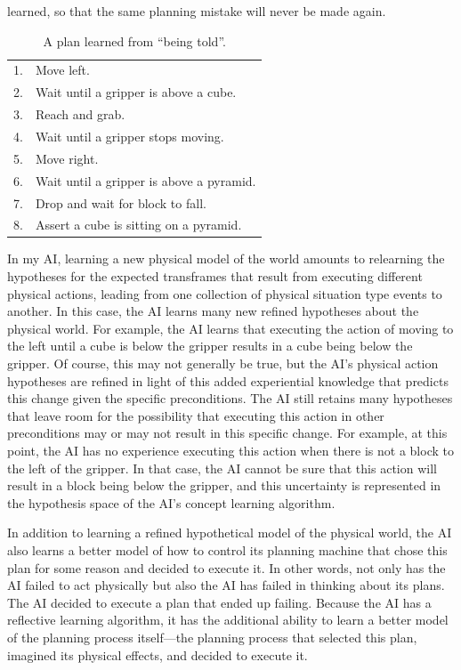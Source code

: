 learned, so that the same planning mistake will never be made again.
\begin{table}
\centering
\begin{tabular}{|rl|}
\hline
 1. & Move left.\\
 2. & Wait until a gripper is above a cube.\\
 3. & Reach and grab.\\
 4. & Wait until a gripper stops moving.\\
 5. & Move right.\\
 6. & Wait until a gripper is above a pyramid.\\
 7. & Drop and wait for block to fall.\\
 8. & Assert a cube is sitting on a pyramid.\\
\hline
\end{tabular}
\caption[A plan learned from ``being told''.]{A plan learned from
  ``being told''.}
\label{table:a_plan_learned_from_being_told}
\end{table}
In my AI, learning a new physical model of the world amounts to
relearning the hypotheses for the expected transframes that result
from executing different physical actions, leading from one collection
of physical situation type events to another.  In this case, the AI
learns many new refined hypotheses about the physical world.  For
example, the AI learns that executing the action of moving to the left
until a cube is below the gripper results in a cube being below the
gripper.  Of course, this may not generally be true, but the AI's
physical action hypotheses are refined in light of this added
experiential knowledge that predicts this change given the specific
preconditions.  The AI still retains many hypotheses that leave room
for the possibility that executing this action in other preconditions
may or may not result in this specific change.  For example, at this
point, the AI has no experience executing this action when there is
not a block to the left of the gripper.  In that case, the AI cannot
be sure that this action will result in a block being below the
gripper, and this uncertainty is represented in the hypothesis space
of the AI's concept learning algorithm.

In addition to learning a refined hypothetical model of the physical
world, the AI also learns a better model of how to control its
planning machine that chose this plan for some reason and decided to
execute it.  In other words, not only has the AI failed to act
physically but also the AI has failed in thinking about its plans.
The AI decided to execute a plan that ended up failing.  Because the
AI has a reflective learning algorithm, it has the additional ability
to learn a better model of the planning process itself---the planning
process that selected this plan, imagined its physical effects, and
decided to execute it.

